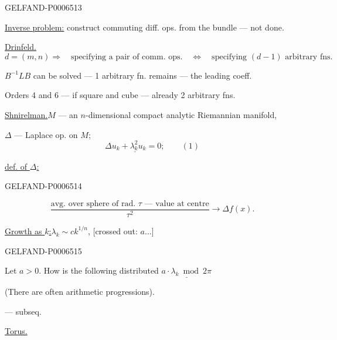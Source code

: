 \begin{GelfandAdjacentEvidence}{GELFAND-P000651}{3}


\underline{Inverse problem:} construct commuting diff. ops. from the bundle --- not done.

\underline{Drinfeld.}
\[
d=(m,n)\Longrightarrow\quad
\text{specifying a pair of comm. ops.}\quad\Longleftrightarrow\quad
\text{specifying \((d-1)\) arbitrary fns.}
\]

\(B^{-1}LB\) can be solved --- 1 arbitrary fn. remains --- the leading coeff.

Orders 4 and 6 --- if square and cube --- already 2 arbitrary fns.

\underline{\underline{Shnirelman.}}\quad \(M\) --- an \(n\)-dimensional compact analytic Riemannian manifold,

\(\Delta\) --- Laplace op. on \(M\);
\[
\underline{\Delta u_k+\lambda_k^2u_k=0;}\qquad(1)
\]

\underline{def. of \(\Delta\):}
\end{GelfandAdjacentEvidence}
\begin{GelfandAdjacentEvidence}{GELFAND-P000651}{4}

\[
\frac{\text{avg. over sphere of rad. \(\tau\) --- value at centre}}{\tau^2}
\longrightarrow\Delta f(x).
\]

\underline{Growth as \(k\):}\quad \(\lambda_k\sim c k^{1/n}\), [crossed out: \(a\ldots\)]
\end{GelfandAdjacentEvidence}
\begin{GelfandAdjacentEvidence}{GELFAND-P000651}{5}


Let \(a>0\). How is the following distributed \(\underline{a\cdot\lambda_k\bmod 2\pi}\)

(There are often arithmetic progressions).

\qquad --- subseq.

\underline{Torus.}
\end{GelfandAdjacentEvidence}
